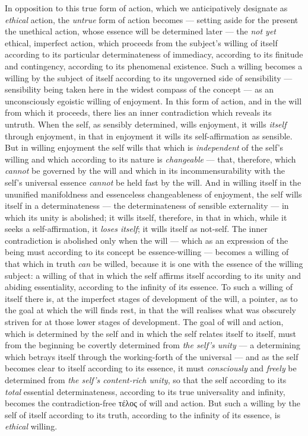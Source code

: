 \documentclass[12pt,a4paper]{book}
\begin{document}
In opposition to this true form of action, which we anticipatively designate
as \emph{ethical} action, the \emph{untrue} form of action becomes --- setting
aside for the present the unethical action, whose essence will be determined
later --- the \emph{not yet} ethical, imperfect action, which proceeds from
the subject's willing of itself according to its particular determinateness of
immediacy, according to its finitude and contingency, according to its
phenomenal existence. Such a willing becomes a willing by the subject of
itself according to its ungoverned side of sensibility --- sensibility being
taken here in the widest compass of the concept --- as an unconsciously
egoistic willing of enjoyment. In this form of action, and in the will from
which it proceeds, there lies an inner contradiction which reveals its untruth.
When the self, as sensibly determined, wills enjoyment, it wills \emph{itself}
through enjoyment, in that in enjoyment it wills its self-affirmation as
sensible. But in willing enjoyment the self wills that which is
\emph{independent} of the self's willing and which according to its nature is
\emph{changeable} --- that, therefore, which \emph{cannot} be governed by the
will and which in its incommensurability with the self's universal essence
\emph{cannot} be held fast by the will. And in willing itself in the ununified
manifoldness and essenceless changeableness of enjoyment, the self wills
itself in a determinateness --- the determinateness of sensible externality
--- in which its unity is abolished; it wills itself, therefore, in that in
which, while it seeks a self-affirmation, it \emph{loses itself}; it wills
itself as not-self. The inner contradiction is abolished only when the will
--- which as an expression of the being must according to its concept be
essence-willing --- becomes a willing of that which in truth \emph{can} be
willed, because it is one with the essence of the willing subject: a willing
of that in which the self affirms itself according to its unity and abiding
essentiality, according to the infinity of its essence. To such a willing of
itself
there is, at the imperfect stages of development of the will, a pointer, as to
the goal at which the will finds rest, in that the will realises what was
obscurely striven for at those lower stages of development. The goal of will
and action, which is determined by the self and in which the self relates
itself to itself, must from the beginning be covertly determined from
\emph{the self's unity} --- a determining which betrays itself through the
working-forth of the universal --- and as the self becomes clear to itself
according to its essence, it must \emph{consciously} and \emph{freely} be
determined from \emph{the self's content-rich unity}, so that the self
according to its \emph{total} essential determinateness, according to its true
universality and infinity, becomes the contradiction-free τέλος of will and
action. But such a willing by the self of itself according to its truth,
according to the infinity of its essence, is \emph{ethical} willing.
\end{document}
